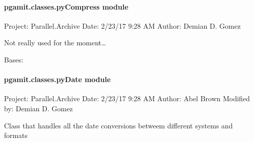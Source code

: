 \documentclass[letterpaper,10pt,english]{sphinxmanual}
\begin{document}
\paragraph{pgamit.classes.pyCompress module}
\label{\detokenize{pgamit.classes:module-pgamit.classes.pyCompress}}\label{\detokenize{pgamit.classes:pgamit-classes-pycompress-module}}
\sphinxAtStartPar
Project: Parallel.Archive
Date: 2/23/17 9:28 AM
Author: Demian D. Gomez

\sphinxAtStartPar
Not really used for the moment…

\begin{fulllineitems}
\label{\detokenize{pgamit.classes:pgamit.classes.pyCompress.Compress}}
\pysigstartsignatures
\pysiglinewithargsret
{}
{\sphinxparamcomma {}}
{}
\pysigstopsignatures
\sphinxAtStartPar
Bases: 

\end{fulllineitems}



\paragraph{pgamit.classes.pyDate module}
\label{\detokenize{pgamit.classes:module-pgamit.classes.pyDate}}\label{\detokenize{pgamit.classes:pgamit-classes-pydate-module}}
\sphinxAtStartPar
Project: Parallel.Archive
Date: 2/23/17 9:28 AM
Author: Abel Brown
Modified by: Demian D. Gomez

\sphinxAtStartPar
Class that handles all the date conversions betweem different systems and formats
\end{document}
